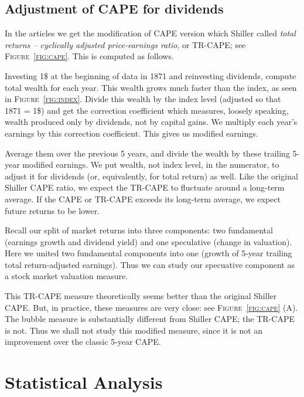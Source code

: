 \documentclass[12pt]{amsart}
\theoremstyle{definition}
\begin{document}
\subsection{Adjustment of CAPE for dividends} In the articles \cite{Bunn, Farouk} we get the modification of CAPE version which Shiller called {\it total returns -- cyclically adjusted price-earnings ratio}, or TR-CAPE; see \textsc{Figure~\ref{fig:cape}}. This is computed as follows.

Investing 1\$ at the beginning of data in 1871 and reinvesting dividends, compute total wealth for each year. This wealth grows much faster than the index, as seen in \textsc{Figure~\ref{fig:index}.} Divide this wealth by the index level (adjusted so that 1871 = 1\$) and get the correction coefficient which measures, loosely speaking, wealth produced only by dividends, not by capital gains. We multiply each year's earnings by this correction coefficient. This gives us modified earnings.

Average them over the previous 5 years, and divide the wealth by these trailing 5-year modified earnings. We put wealth, not index level, in the numerator, to adjust it for dividends (or, equivalently, for total return) as well. Like the original Shiller CAPE ratio, we expect the TR-CAPE to fluctuate around a long-term average. If the CAPE or TR-CAPE exceeds its long-term average, we expect future returns to be lower. 

Recall our split of market returns into three components: two fundamental (earnings growth and dividend yield) and one speculative (change in valuation). Here we united two fundamental components into one (growth of 5-year trailing total return-adjusted earnings). Thus we can study our specuative component as a stock market valuation measure. 

This TR-CAPE measure theoretically seems better than the original Shiller CAPE. But, in practice, these measures are very close: see \textsc{Figure~\ref{fig:cape} (A).} The bubble measure is substantially different from Shiller CAPE; the TR-CAPE is not. Thus we shall not study this modified measure, since it is not an improvement over the classic 5-year CAPE.

\section{Statistical Analysis}
\end{document}

